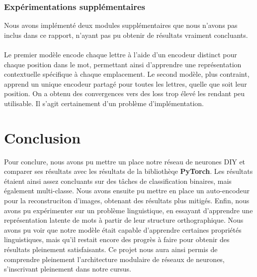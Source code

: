 \documentclass{article}
\begin{document}
\subsubsection{Expérimentations supplémentaires}
Nous avons implémenté deux modules supplémentaires que nous n'avons pas inclus dans ce rapport, n'ayant pas pu obtenir de résultats vraiment concluants. 
\\ \\
Le premier modèle encode chaque lettre à l’aide d’un encodeur distinct pour chaque position dans le mot, permettant ainsi d’apprendre une représentation contextuelle spécifique à chaque emplacement. Le second modèle, plus contraint, apprend un unique encodeur partagé pour toutes les lettres, quelle que soit leur position. On a obtenu des convergences vers des loss trop élevé les rendant peu utilisable. Il s'agit certainement d'un problème d'implémentation.

\section{Conclusion}
Pour conclure, nous avons pu mettre un place notre réseau de neurones DIY et comparer ses résultats avec les résultats de la bibliothèqe \textbf{PyTorch}. Les résultats étaient ainsi assez concluants sur des tâches de classification binaires, mais également multi-classe. Nous avons ensuite pu mettre en place un auto-encodeur pour la reconstruciton d'images, obtenant des résultats plus mitigés. Enfin, nous avons pu expérimenter sur un problème linguistique, en essayant d'apprendre une représentation latente de mots à partir de leur structure orthographique. Nous avons pu voir que notre modèle était capable d'apprendre certaines propriétés linguistiques, mais qu'il restait encore des progrès à faire pour obtenir des résultats pleinement satisfaisants. Ce projet nous aura ainsi permis de comprendre pleinement l'architecture modulaire de réseaux de neurones, s'inscrivant pleinement dans notre cursus.
\end{document}

